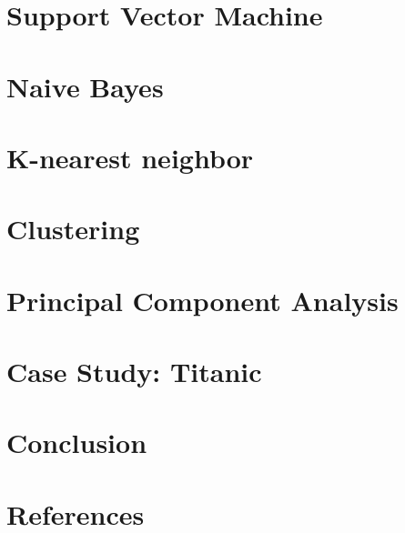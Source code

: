
 \section[SVM]{Support Vector Machine}



 \section[NB]{Naive Bayes}




 \section[Knn]{K-nearest neighbor}



 \section[Clust]{Clustering}





 \section[PCA]{Principal Component Analysis}



 \section[Case]{Case Study: Titanic}




 \section[End]{Conclusion}




 \section[Refs]{References}
